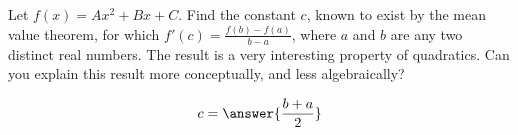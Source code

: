 \documentclass{ximera}
\author{Steven Gubkin}
\begin{document}
\begin{exercise}

Let $f(x) = Ax^2+Bx+C$.  Find the constant $c$, known to exist by the mean value theorem, for which $f'(c) = \frac{f(b)-f(a)}{b-a}$, where $a$ and $b$ are any two distinct real numbers.  The result is a very interesting property of quadratics.  Can you explain this result more conceptually, and less algebraically?

\begin{prompt}
	$$c = \answer{\frac{b+a}{2}}$$
\end{prompt}

\end{exercise}
\end{document}
